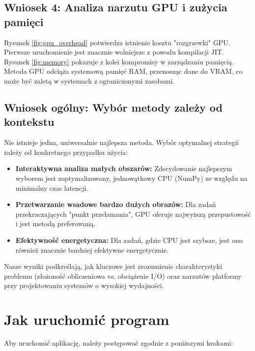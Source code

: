 \documentclass[12pt,a4paper]{article}
\begin{document}
\subsection{Wniosek 4: Analiza narzutu GPU i zużycia pamięci}
Rysunek \ref{fig:gpu_overhead} potwierdza istnienie kosztu "rozgrzewki" GPU. Pierwsze uruchomienie jest znacznie wolniejsze z powodu kompilacji JIT. Rysunek \ref{fig:memory} pokazuje z kolei kompromisy w zarządzaniu pamięcią. Metoda GPU odciąża systemową pamięć RAM, przenosząc dane do VRAM, co może być zaletą w systemach z ograniczonymi zasobami.

\subsection{Wniosek ogólny: Wybór metody zależy od kontekstu}
Nie istnieje jedna, uniwersalnie najlepsza metoda. Wybór optymalnej strategii zależy od konkretnego przypadku użycia:
\begin{itemize}
    \item \textbf{Interaktywna analiza małych obszarów:} Zdecydowanie najlepszym wyborem jest zoptymalizowany, jednowątkowy CPU (NumPy) ze względu na minimalny czas latencji.
    \item \textbf{Przetwarzanie wsadowe bardzo dużych obrazów:} Dla zadań przekraczających "punkt przełamania", GPU oferuje najwyższą przepustowość i jest metodą preferowaną.
    \item \textbf{Efektywność energetyczna:} Dla zadań, gdzie CPU jest szybsze, jest ono również znacznie bardziej efektywne energetycznie.
\end{itemize}
Nasze wyniki podkreślają, jak kluczowe jest zrozumienie charakterystyki problemu (złożoność obliczeniowa vs. obciążenie I/O) oraz narzutów platformy przy projektowaniu systemów o wysokiej wydajności.

\section{Jak uruchomić program}
Aby uruchomić aplikację, należy postępować zgodnie z poniższymi krokami:
\end{document}
